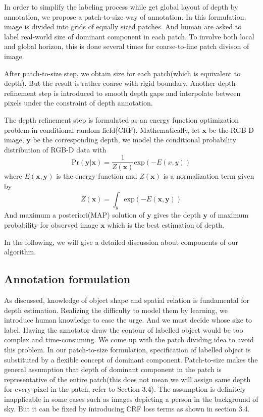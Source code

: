 \documentclass[10pt,twocolumn,letterpaper]{article}
\begin{document}
\par
In order to simplify the labeling process while get global layout of depth by annotation, we propose a patch-to-size way of annotation. In this formulation, image is divided into grids of equally sized patches. And human are asked to label real-world size of dominant component in each patch. To involve both local and global horizon, this is done several times for coarse-to-fine patch divison of image.
\par
After patch-to-size step, we obtain size for each patch(which is equivalent to depth). But the result is rather coarse with rigid boundary. Another depth refinement step is introduced to smooth depth gaps and interpolate between pixels under the constraint of depth annotation. 
\par
The depth refinement step is formulated as an energy function optimization problem in conditional random field(CRF). Mathematically, let $\mathbf{x}$ be the RGB-D image, $\mathbf{y}$ be the corresponding depth, we model the conditional probability distribution of RGB-D data with
\begin{equation}
\text{Pr}(\mathbf{y}|\mathbf{x}) = \frac{1}{Z(\mathbf{x})}\text{exp}(-E(x, y))
\end{equation}
where $E(\mathbf{x}, \mathbf{y})$ is the energy function and $Z(\mathbf{x})$ is a normalization term given by
\begin{equation}
Z(\mathbf{x}) = \int_y\text{exp}(-E(\mathbf{x}, \mathbf{y}))
\end{equation}
And maximum a posteriori(MAP) solution of $\mathbf{y}$ gives the depth $\mathbf{y}$ of maximum probability for observed image $\mathbf{x}$ which is the best estimation of depth.
\par
In the following, we will give a detailed discussion about components of our algorithm.
\subsection{Annotation formulation}
As discussed, knowledge of object shape and spatial relation is fundamental for depth estimation. Realizing the difficulty to model them by learning, we introduce human knowledge to ease the urge. And we must decide whose size to label. Having the annotator draw the contour of labelled object would be too complex and time-consuming. We come up with the patch dividing idea to avoid this problem. In our patch-to-size formulation, specification of labelled object is substituted by a flexible concept of dominant component. Patch-to-size makes the general assumption that depth of dominant component in the patch is representative of the entire patch(this does not mean we will assign same depth for every pixel in the patch, refer to Section 3.4). The assumption is definitely inapplicable in some cases such as images depicting a person in the background of sky. But it can be fixed by introducing CRF loss terms as shown in section 3.4.
\end{document}
